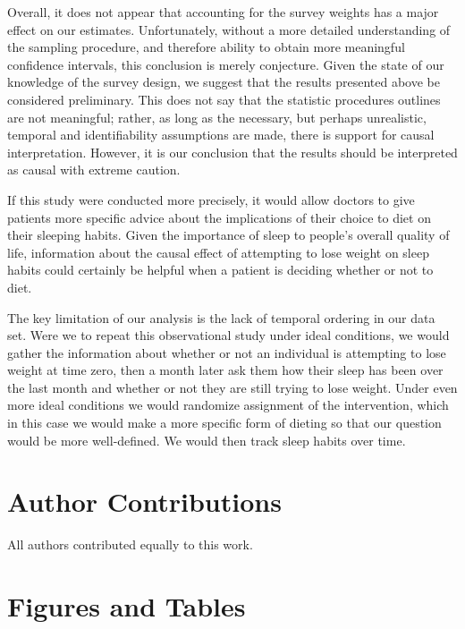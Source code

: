 \documentclass{article}
\begin{document}
Overall, it does not appear that accounting for the survey weights has a major effect on our estimates. Unfortunately, without a more detailed understanding of the sampling procedure, and therefore ability to obtain more meaningful confidence intervals, this conclusion is merely conjecture. Given the state of our knowledge of the survey design, we suggest that the results presented above be considered preliminary. This does not say that the statistic procedures outlines are not meaningful; rather, as long as the necessary, but perhaps unrealistic, temporal and identifiability assumptions are made, there is support for causal interpretation. However, it is our conclusion that the results should be interpreted as causal with extreme caution.

If this study were conducted more precisely, it would allow doctors to give patients more specific advice about the implications of their choice to diet on their sleeping habits.  Given the importance of sleep to people's overall quality of life, information about the causal effect of attempting to lose weight on sleep habits could certainly be helpful when a patient is deciding whether or not to diet.

The key limitation of our analysis is the lack of temporal ordering in our data set. Were we to repeat this observational study under ideal conditions, we would gather the information about whether or not an individual is attempting to lose weight at time zero, then a month later ask them how their sleep has been over the last month and whether or not they are still trying to lose weight. Under even more ideal conditions we would randomize assignment of the intervention, which in this case we would make a more specific form of dieting so that our question would be more well-defined. We would then track sleep habits over time.

\section{Author Contributions}
All authors contributed equally to this work.


{}

\appendix
\section{Figures and Tables}
\end{document}
